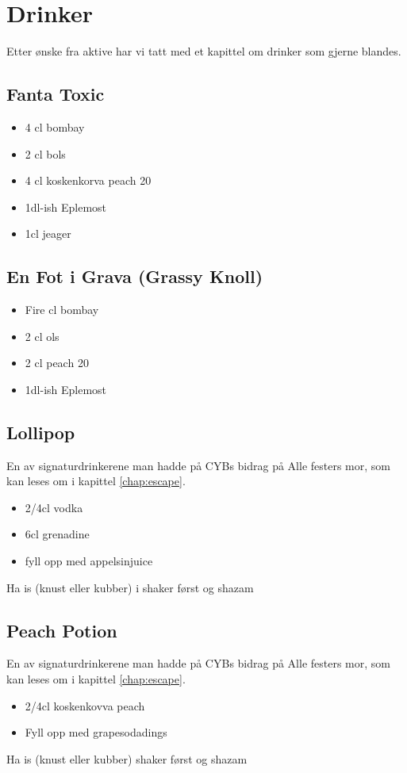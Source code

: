 \chapter*{Drinker}

Etter ønske fra aktive har vi tatt med et kapittel om drinker som gjerne blandes.

\section*{Fanta Toxic}

\begin{itemize}
	\item 4 cl bombay
	\item 2 cl bols
	\item 4 cl koskenkorva peach 20%
	\item 1dl-ish Eplemost
	\item 1cl jeager
\end{itemize}

\section*{En Fot i Grava (Grassy Knoll)}

\begin{itemize}
	\item Fire cl bombay
	\item 2 cl ols
	\item 2 cl peach 20%
	\item 1dl-ish Eplemost
\end{itemize}

\section*{Lollipop}

En av signaturdrinkerene man hadde på CYBs bidrag på Alle festers mor, som kan leses om i kapittel \ref{chap:escape}.

\begin{itemize}
	\item 2/4cl vodka
	\item 6cl grenadine
	\item fyll opp med appelsinjuice
\end{itemize}

Ha is (knust eller kubber) i shaker først og shazam

\section*{Peach Potion}

En av signaturdrinkerene man hadde på CYBs bidrag på Alle festers mor, som kan leses om i kapittel \ref{chap:escape}.

\begin{itemize}
	\item 2/4cl koskenkovva peach
	\item Fyll opp med grapesodadings
\end{itemize}

Ha is (knust eller kubber) shaker først og shazam